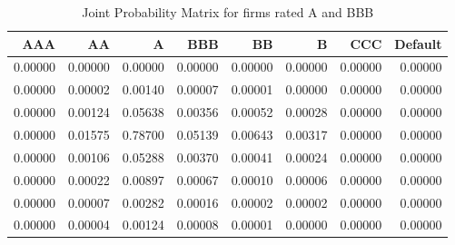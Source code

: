 \begin{table}[H]
\caption{Joint Probability Matrix for firms rated A and BBB}
\label{tab:Probability Matrix}
\begin{tabular}{rrrrrrrr}
\toprule
AAA & AA & A & BBB & BB & B & CCC & Default \\
\midrule
0.00000 & 0.00000 & 0.00000 & 0.00000 & 0.00000 & 0.00000 & 0.00000 & 0.00000 \\
0.00000 & 0.00002 & 0.00140 & 0.00007 & 0.00001 & 0.00000 & 0.00000 & 0.00000 \\
0.00000 & 0.00124 & 0.05638 & 0.00356 & 0.00052 & 0.00028 & 0.00000 & 0.00000 \\
0.00000 & 0.01575 & 0.78700 & 0.05139 & 0.00643 & 0.00317 & 0.00000 & 0.00000 \\
0.00000 & 0.00106 & 0.05288 & 0.00370 & 0.00041 & 0.00024 & 0.00000 & 0.00000 \\
0.00000 & 0.00022 & 0.00897 & 0.00067 & 0.00010 & 0.00006 & 0.00000 & 0.00000 \\
0.00000 & 0.00007 & 0.00282 & 0.00016 & 0.00002 & 0.00002 & 0.00000 & 0.00000 \\
0.00000 & 0.00004 & 0.00124 & 0.00008 & 0.00001 & 0.00000 & 0.00000 & 0.00000 \\
\bottomrule
\end{tabular}
\end{table}
